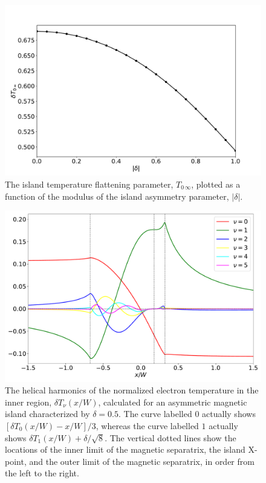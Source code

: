 \documentclass{iopjournal}
\begin{document}
{\begin{figure}
\centerline{\includegraphics[width=\textwidth]{Fig5.pdf}}
\caption{The island temperature flattening parameter, $T_{0\,\infty}$, plotted as a function of the modulus of the island asymmetry parameter, $|\delta|$.  \label{fig3}}
\end{figure}

\begin{figure}
\centerline{\includegraphics[width=\textwidth]{Fig6.pdf}}
\caption{The helical harmonics of the normalized electron temperature  in the inner region, $\delta T_\nu(x/W)$, calculated for an asymmetric
magnetic island characterized by $\delta=0.5$.  The curve labelled $0$ actually shows $[\delta T_0(x/W)-x/W]/3$, whereas the
curve labelled  $1$ actually
shows $\delta T_1(x/W) +  \delta/\sqrt{8}$. The vertical dotted lines show the locations of the inner limit of the magnetic separatrix,
the island X-point, and the outer limit of the magnetic separatrix, in order from the left to the right.\label{fig4}}
\end{figure}

}
\end{document}
